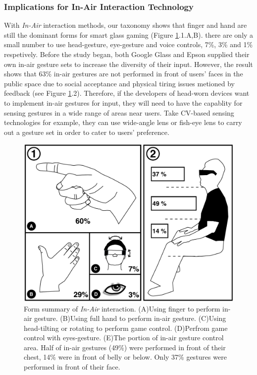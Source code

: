 \documentclass{sigchi}
\begin{document}
    \subsubsection{Implications for In-Air Interaction Technology}
    With \emph{In-Air} interaction methods, our taxonomy shows that finger and hand are still the dominant  forms for smart glass gaming (Figure \ref{fig:figureInAirPorpotion}.1.{A,B}). there are only a small number to use head-gesture, eye-gesture and voice controls, 7\%, 3\% and 1\% respetively.
    Before the study began, both Google Glass and Epson\cite{GoogleGlass, Colaco:2013:MCL:2501988.2502042} supplied their own in-air gesture sets to increase the diversity of their input. However, the result shows that 63\% in-air gestures are not performed in front of users' faces in the public space due to social acceptance and physical tiring issues metioned by feedback (see Figure \ref{fig:figureInAirPorpotion}.2). Therefore, if the developers of head-worn devices want to implement in-air gestures for input, they will need to have the capablity for sensing gestures in a wide range of areas near users. Take CV-based sensing technologies for example, they can use wide-angle lens or fish-eye lens to carry out a gesture set in order to cater to users' preference.   
  \begin{figure}[!h]
  \centering
  \includegraphics[width=1\columnwidth]{InAirControlArea.pdf}
  \caption{Form summary of \emph{In-Air} interaction. (A)Using finger to perform in-air gesture. (B)Using full hand to perform in-air gesture. (C)Using head-tilting or rotating to perform game control. (D)Perfrom game control with eyes-gesture. (E)The portion of in-air gesture control area. Half of in-air gestures (49\%) were performed in front of their chest, 14\% were in front of belly or below. Only 37\% gestures were performed in front of their face.}
  \label{fig:figureInAirPorpotion}
  \end{figure}
\end{document}
